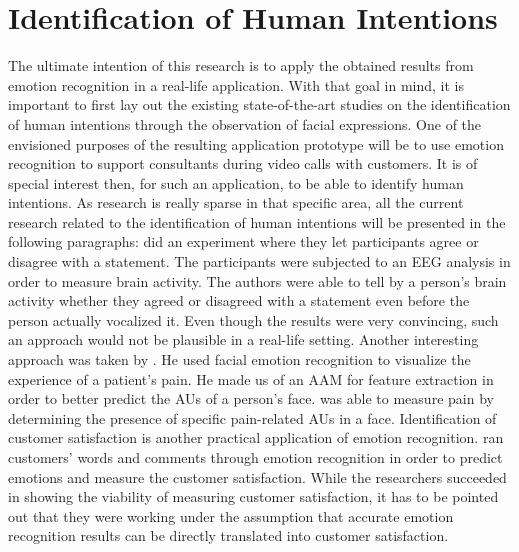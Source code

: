 \section{Identification of Human Intentions}
The ultimate intention of this research is to apply the obtained results from emotion recognition in a real-life application. With that goal in mind, it is important to first lay out the existing state-of-the-art studies on the identification of human intentions through the observation of facial expressions. One of the envisioned purposes of the resulting application prototype will be to use emotion recognition to support consultants during video calls with customers.
\newline\newline
It is of special interest then, for such an application, to be able to identify human intentions. As research is really sparse in that specific area, all the current research related to the identification of human intentions will be presented in the following paragraphs:
\newline\newline
\citet{Dong:2012:UnderstandHumanImplicitIntention} did an experiment where they let participants agree or disagree with a statement. The participants were subjected to an \gls{EEG} analysis in order to measure brain activity. The authors were able to tell by a person’s brain activity whether they agreed or disagreed with a statement even before the person actually vocalized it. Even though the results were very convincing, such an approach would not  be plausible in a real-life setting.
\newline\newline
Another interesting approach was taken by \citet{Esser:2018:LandmarkDetection}. He used facial emotion recognition to visualize the experience of a patient's pain. He made us of an \gls{AAM} for feature extraction in order to better predict the AUs of a person's face. \citeauthor{Esser:2018:LandmarkDetection} was able to measure pain by determining the presence of specific pain-related AUs in a face.
\newline\newline
Identification of customer satisfaction is another practical application of emotion recognition. \citet{Ren:2012:ERforCustomerSatisfaction} ran customers' words and comments through emotion recognition in order to predict emotions and measure the customer satisfaction. While the researchers succeeded in showing the viability of measuring customer satisfaction, it has to be pointed out that they were working under the assumption that accurate emotion recognition results can be directly translated into customer satisfaction.
